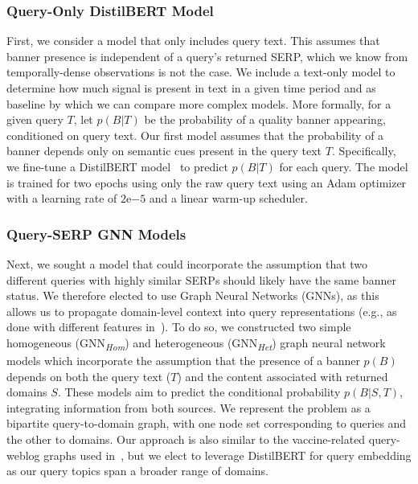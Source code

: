 {\subsubsection{Query-Only DistilBERT Model}
\label{sec:methods-models-distilbert}
First, we consider a model that only includes query text. 
This assumes that banner presence is independent of a query's returned SERP, which we know from temporally-dense observations is not the case. 
We include a text-only model to determine how much signal is present in text in a given time period and as baseline by which we can compare more complex models. 
More formally, for a given query $T$, let $p(B | T)$ be the probability of a quality banner appearing, conditioned on query text. 
Our first model assumes that the probability of a banner depends only on semantic cues present in the query text $T$. 
Specifically, we fine-tune a DistilBERT model~\citep{sanh2019distilbert} to predict $p(B | T)$ for each query. 
The model is trained for two epochs using only the raw query text using an Adam optimizer with a learning rate of $2\mathrm{e}{-5}$ and a linear warm-up scheduler.

\subsubsection{Query-SERP GNN Models}
\label{sec:methods-models-gnn}

Next, we sought a model that could incorporate the assumption that two different queries with highly similar SERPs should likely have the same banner status. 
We therefore elected to use Graph Neural Networks (GNNs), as this allows us to propagate domain-level context into query representations (e.g., as done with different features in~\citep{williams2024dredge}).   %
To do so, we constructed two simple homogeneous (GNN\textsubscript{\emph{Hom}}) and heterogeneous (GNN\textsubscript{\emph{Het}}) graph neural network models which incorporate the assumption that the presence of a banner $p(B)$ depends on both the query text ($T$) and the content associated with returned domains $S$. 
These models aim to predict the conditional probability $p(B | S, T)$, integrating information from both sources. 
We represent the problem as a bipartite query-to-domain graph, with one node set corresponding to queries and the other to domains. 
Our approach is also similar to the vaccine-related query-weblog graphs used in~\citep{chang2024measuring}, but we elect to leverage DistilBERT for query embedding as our query topics span a broader range of domains.

}
